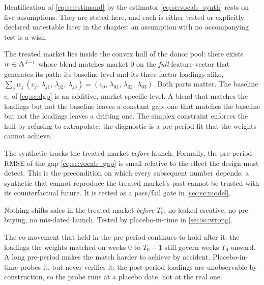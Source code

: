 Identification of \cref{eq:sc:estimand} by the estimator \cref{eq:sc:vocab_synth} rests on five
assumptions. They are stated here, and each is either tested or explicitly declared untestable
later in the chapter: an assumption with no accompanying test is a wish.

\begin{assumption}\label{as:sc:hull}
The treated market lies inside the convex hull of the donor pool: there exists $w \in \Delta^{J-1}$
whose blend matches market $0$ on the \emph{full} feature vector that generates its path: its
baseline level and its three factor loadings alike,
$\sum_j w_j\,(c_j,\, \lambda_{j1},\, \lambda_{j2},\, \lambda_{j3})
   = (c_0,\, \lambda_{01},\, \lambda_{02},\, \lambda_{03})$. Both parts matter. The baseline
$c_i$ of \cref{eq:sc:dgp} is an additive, market-specific level. A blend that matches the
loadings but not the baseline leaves a constant gap; one that matches the baseline but not the
loadings leaves a drifting one. The simplex constraint enforces the hull by refusing to
extrapolate; the diagnostic is a pre-period fit that the weights cannot achieve.
\end{assumption}

\begin{assumption}\label{as:sc:prefit}
The synthetic tracks the treated market \emph{before} launch. Formally, the pre-period RMSE of
the gap \cref{eq:sc:vocab_gap} is small relative to the effect the design must detect. This is the
precondition on which every subsequent number depends: a synthetic that cannot reproduce the
treated market's past cannot be trusted with its counterfactual future. It is tested as a
pass/fail gate in \cref{sec:sc:model}.
\end{assumption}

\begin{assumption}[No anticipation]\label{as:sc:anticip}
Nothing shifts sales in the treated market \emph{before} $T_0$: no leaked creative, no
pre-buying, no mis-dated launch. Tested by placebo-in-time in \cref{sec:sc:wrong}.
\end{assumption}

\begin{assumption}\label{as:sc:stable}
The co-movement that held in the pre-period continues to hold after it: the loadings the weights
matched on weeks $0$ to $T_0 - 1$ still govern weeks $T_0$ onward. A long pre-period makes the
match harder to achieve by accident. Placebo-in-time probes it, but never verifies it: the
post-period loadings are unobservable by construction, so the probe runs at a placebo date, not at
the real one.
\end{assumption}

